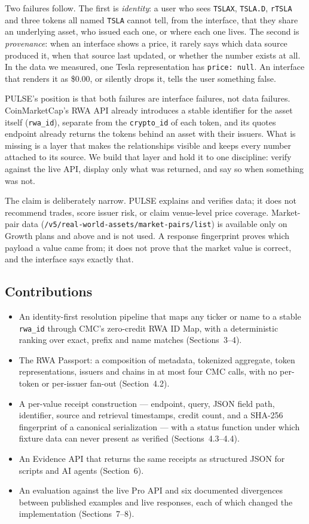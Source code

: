 \documentclass[11pt]{article}
\newcommand{\code}[1]{\texttt{\small #1}}
\begin{document}
Two failures follow. The first is \emph{identity}: a user who sees \code{TSLAX}, \code{TSLA.D}, \code{rTSLA} and three tokens all named \code{TSLA} cannot tell, from the interface, that they share an underlying asset, who issued each one, or where each one lives. The second is \emph{provenance}: when an interface shows a price, it rarely says which data source produced it, when that source last updated, or whether the number exists at all. In the data we measured, one Tesla representation has \code{price: null}. An interface that renders it as \$0.00, or silently drops it, tells the user something false.

\textsc{PULSE}'s position is that both failures are interface failures, not data failures. CoinMarketCap's RWA API already introduces a stable identifier for the asset itself (\code{rwa\_id}), separate from the \code{crypto\_id} of each token, and its quotes endpoint already returns the tokens behind an asset with their issuers. What is missing is a layer that makes the relationships visible and keeps every number attached to its source. We build that layer and hold it to one discipline: verify against the live API, display only what was returned, and say so when something was not.

The claim is deliberately narrow. \textsc{PULSE} explains and verifies data; it does not recommend trades, score issuer risk, or claim venue-level price coverage. Market-pair data (\code{/v5/real-world-assets/market-pairs/list}) is available only on Growth plans and above and is not used. A response fingerprint proves which payload a value came from; it does not prove that the market value is correct, and the interface says exactly that.

\subsection{Contributions}
\begin{itemize}
\item An identity-first resolution pipeline that maps any ticker or name to a stable \code{rwa\_id} through CMC's zero-credit RWA ID Map, with a deterministic ranking over exact, prefix and name matches (Sections~3--4).
\item The RWA Passport: a composition of metadata, tokenized aggregate, token representations, issuers and chains in at most four CMC calls, with no per-token or per-issuer fan-out (Section~4.2).
\item A per-value receipt construction --- endpoint, query, JSON field path, identifier, source and retrieval timestamps, credit count, and a SHA-256 fingerprint of a canonical serialization --- with a status function under which fixture data can never present as verified (Sections~4.3--4.4).
\item An Evidence API that returns the same receipts as structured JSON for scripts and AI agents (Section~6).
\item An evaluation against the live Pro API and six documented divergences between published examples and live responses, each of which changed the implementation (Sections~7--8).
\end{itemize}
\end{document}
